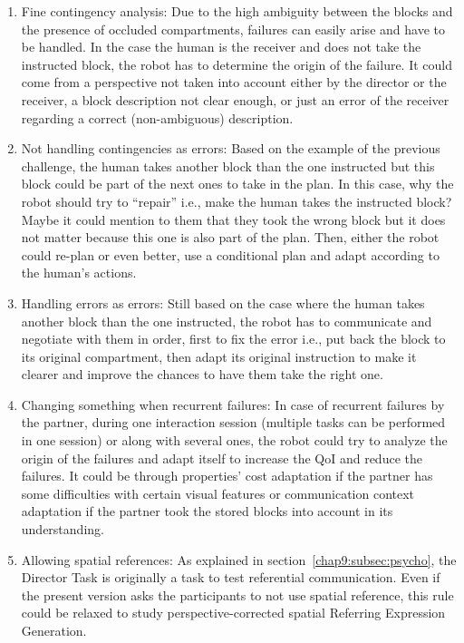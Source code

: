 \documentclass[a4paper,11pt,twoside]{StyleThese}
\begin{document}
\begin{enumerate}[leftmargin=* ,parsep=0cm,itemsep=0cm,topsep=0cm]
	\item Fine contingency analysis:  Due to the high ambiguity between the blocks and the presence of occluded compartments, failures can easily arise and have to be handled. In the case the human is the receiver and does not take the instructed block, the robot has to determine the origin of the failure. It could come from a perspective not taken into account either by the director or the receiver, a block description not clear enough, or just an error of the receiver regarding a correct (non-ambiguous) description.\label{chal:cont_analysis}
	\item Not handling contingencies as errors: Based on the example of the previous challenge, the human takes another block than the one instructed but this block could be part of the next ones to take in the plan. In this case, why the robot should try to ``repair'' i.e., make the human takes the instructed block? Maybe it could mention to them that they took the wrong block but it does not matter because this one is also part of the plan. Then, either the robot could re-plan or even better, use a conditional plan and adapt according to the human's actions.\label{chal:cont_not_errors}
	\item Handling errors as errors: Still based on the case where the human takes another block than the one instructed, the robot has to communicate and negotiate with them in order, first to fix the error i.e., put back the block to its original compartment, then adapt its original instruction to make it clearer and improve the chances to have them take the right one.\label{chal:cont_errors}
	\item Changing something when recurrent failures: In case of recurrent failures by the partner, during one interaction session (multiple tasks can be performed in one session) or along with several ones, the robot could try to analyze the origin of the failures and adapt itself to increase the QoI and reduce the failures. It could be through properties' cost adaptation if the partner has some difficulties with certain visual features or communication context adaptation if the partner took the stored blocks into account in its understanding.\label{chal:change}
	\item Allowing spatial references: As explained in section~\ref{chap9:subsec:psycho}, the Director Task is originally a task to test referential communication. Even if the present version asks the participants to not use spatial reference, this rule could be relaxed to study perspective-corrected spatial Referring Expression Generation.\label{chal:spatial_ref}

\end{enumerate}
\end{document}
